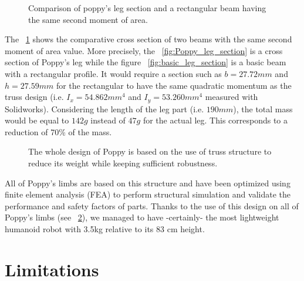 \begin{figure}[!ht]
\centering
    \hfil
    \caption{Comparison of poppy's leg section and a rectangular beam having the same second moment of area.}
    \label{fig:leg_section}
\end{figure}

The \figurename~\ref{fig:leg_section} shows the comparative cross section of two beams with the same second moment of area value. More precisely, the \figurename~\ref{fig:Poppy_leg_section} is a cross section of Poppy's leg while the figure \figurename~\ref{fig:basic_leg_section} is a basic beam with a rectangular profile.
It would require a section such as $b=27.72 mm$ and $h=27.59 mm$ for the rectangular to have the same quadratic momentum as the truss design (i.e. $I_x = 54.862 mm^4$ and $I_y = 53.260 mm^4$ measured with Solidworks).
Considering the length of the leg part (i.e. $190 mm$), the total mass would be equal to $142 g$ instead of $47 g$ for the actual leg. This corresponds to a reduction of 70\% of the mass.

\begin{figure}[!tb]
\centering
    \hfill
    \caption{The whole design of Poppy is based on the use of truss structure to reduce its weight while keeping sufficient robustness.}
    \label{fig:poppy_truss_structure}
\end{figure}

All of Poppy’s limbs are based on this structure and have been optimized using finite element analysis (FEA) to perform structural simulation and validate the performance and safety factors of parts.
Thanks to the use of this design on all of Poppy's limbs (see \figurename~\ref{fig:poppy_truss_structure}), we managed to have -certainly- the most lightweight humanoid robot with 3.5kg relative to its 83 cm height.

\clearpage





\section{Limitations} %

